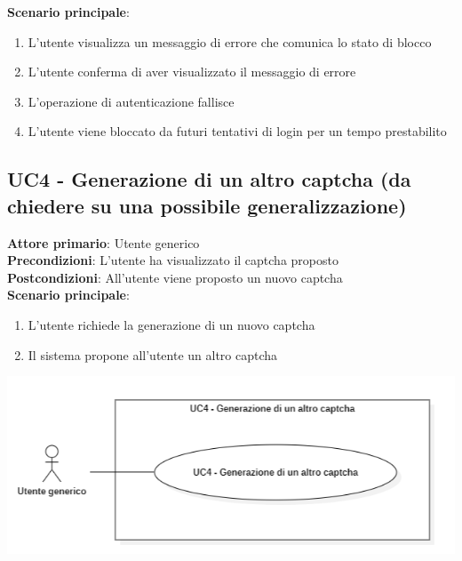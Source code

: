 \textbf{Scenario principale}:
\begin{enumerate}
   \item L'utente visualizza un messaggio di errore che comunica lo stato di blocco
   \item L'utente conferma di aver visualizzato il messaggio di errore
   \item L'operazione di autenticazione fallisce
   \item L'utente viene bloccato da futuri tentativi di login per un tempo prestabilito
\end{enumerate}

\subsection{UC4 - Generazione di un altro captcha (da chiedere su una possibile generalizzazione)}
\textbf{Attore primario}: Utente generico\\
\textbf{Precondizioni}: L'utente ha visualizzato il captcha proposto\\
\textbf{Postcondizioni}: All'utente viene proposto un nuovo captcha\\

\textbf{Scenario principale}:
\begin{enumerate}
   \item L'utente richiede la generazione di un nuovo captcha
   \item Il sistema propone all'utente un altro captcha
\end{enumerate}

\begin{center}
	\includegraphics[scale = 0.9]{img/Generazione_captcha.png}\\
\end{center}